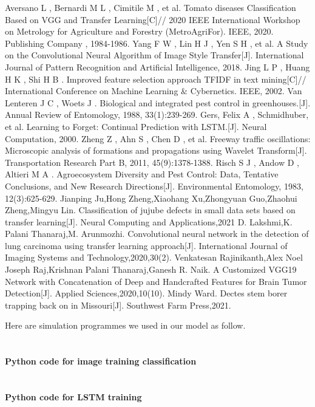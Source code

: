 \documentclass{mcmthesis}
\begin{document}

\newpage
\begin{thebibliography}{99}
 Aversano L , Bernardi M L , Cimitile M , et al. Tomato diseases Classification Based on VGG and Transfer Learning[C]// 2020 IEEE International Workshop on Metrology for Agriculture and Forestry (MetroAgriFor). IEEE, 2020.
Publishing Company , 1984-1986.
Yang F W , Lin H J , Yen S H , et al. A Study on the Convolutional Neural Algorithm of Image Style Transfer[J]. International Journal of Pattern Recognition and Artificial Intelligence, 2018.
Jing L P , Huang H K , Shi H B . Improved feature selection approach TFIDF in text mining[C]// International Conference on Machine Learning $ \& $ Cybernetics. IEEE, 2002.
Van Lenteren J C , Woets J . Biological and integrated pest control in greenhouses.[J]. Annual Review of Entomology, 1988, 33(1):239-269.
Gers, Felix A , Schmidhuber, et al. Learning to Forget: Continual Prediction with LSTM.[J]. Neural Computation, 2000.
Zheng Z , Ahn S , Chen D , et al. Freeway traffic oscillations: Microscopic analysis of formations and propagations using Wavelet Transform[J]. Transportation Research Part B, 2011, 45(9):1378-1388.
Risch S J , Andow D , Altieri M A . Agroecosystem Diversity and Pest Control: Data, Tentative Conclusions, and New Research Directions[J]. Environmental Entomology, 1983, 12(3):625-629.
Jianping Ju,Hong Zheng,Xiaohang Xu,Zhongyuan Guo,Zhaohui Zheng,Mingyu Lin. Classification of jujube defects in small data sets based on transfer learning[J]. Neural Computing and Applications,2021
D. Lakshmi,K. Palani Thanaraj,M. Arunmozhi. Convolutional neural network in the detection of lung carcinoma using transfer learning approach[J]. International Journal of Imaging Systems and Technology,2020,30(2).
Venkatesan Rajinikanth,Alex Noel Joseph Raj,Krishnan Palani Thanaraj,Ganesh R. Naik. A Customized VGG19 Network with Concatenation of Deep and Handcrafted Features for Brain Tumor Detection[J]. Applied Sciences,2020,10(10).
Mindy Ward. Dectes stem borer trapping back on in Missouri[J]. Southwest Farm Press,2021.

\end{thebibliography}
\begin{appendices}
Here are simulation programmes we used in our model as follow.\\
\section{}
\textbf{\textcolor[rgb]{0.98,0.00,0.00}{Python code for image training classification}}


\hspace*{\fill}
\section{}\textbf{\textcolor[rgb]{0.98,0.00,0.00}{Python code for LSTM training}}

\end{appendices}
\end{document}
